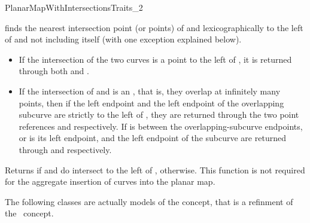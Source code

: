 \begin{ccRefConcept}{PlanarMapWithIntersectionsTraits_2}
	 {finds the nearest intersection point (or points) of  and
	   lexicographically to the left of  and not including
	   itself (with one exception explained below).
           \begin{itemize}
           \item If the intersection of the two curves is a point to the
	   left of , it is returned through both  and .
	   \item If the intersection of  and  is an
	   , that is, they overlap at infinitely many
	   points, then if the left endpoint and the left endpoint of the
	   overlapping subcurve are strictly to the left of , they are
	   returned through the two point references  and 
	   respectively. If  is between the overlapping-subcurve
	   endpoints, or  is its left endpoint,  and the left
	   endpoint of the subcurve are returned through  and 
	   respectively.
           \end{itemize}
	  Returns  if  and  do intersect to the left
	  of ,  otherwise. \newline
          This function is not required for the aggregate insertion of curves 
          into the planar map.}

\ccHasModels
The following classes are actually models of the  
concept, that is a refinment of the \ccRefName\ concept. 

  \\
  \\
   \\

\end{ccRefConcept}

\ccRefPageEnd
